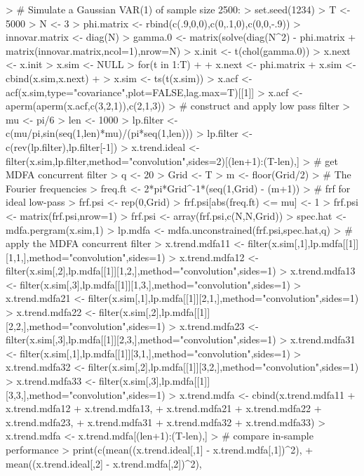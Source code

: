 \documentclass[a4paper]{book}
\begin{document}
\begin{Schunk}
\begin{Sinput}
> # Simulate a Gaussian VAR(1) of sample size 2500:
> set.seed(1234)
> T <- 5000
> N <- 3
> phi.matrix <- rbind(c(.9,0,0),c(0,.1,0),c(0,0,-.9))
> innovar.matrix <- diag(N)
> gamma.0 <- matrix(solve(diag(N^2) - phi.matrix %
+ 	matrix(innovar.matrix,ncol=1),nrow=N)
> x.init <- t(chol(gamma.0)) %
> x.next <- x.init
> x.sim <- NULL
> for(t in 1:T)
+ {
+ 	x.next <- phi.matrix %
+ 	x.sim <- cbind(x.sim,x.next)
+ }
> x.sim <- ts(t(x.sim))
> x.acf <- acf(x.sim,type="covariance",plot=FALSE,lag.max=T)[[1]]
> x.acf <- aperm(aperm(x.acf,c(3,2,1)),c(2,1,3))
> # construct and apply low pass filter
> mu <- pi/6
> len <- 1000
> lp.filter <- c(mu/pi,sin(seq(1,len)*mu)/(pi*seq(1,len)))
> lp.filter <- c(rev(lp.filter),lp.filter[-1])
> x.trend.ideal <- filter(x.sim,lp.filter,method="convolution",sides=2)[(len+1):(T-len),]
> # get MDFA concurrent filter
> q <- 20
> Grid <- T
> m <- floor(Grid/2)
> # The Fourier frequencies
> freq.ft <- 2*pi*Grid^{-1}*(seq(1,Grid) - (m+1))
> # frf for ideal low-pass
> frf.psi <- rep(0,Grid)
> frf.psi[abs(freq.ft) <= mu] <- 1
> frf.psi <- matrix(frf.psi,nrow=1) %
> frf.psi <- array(frf.psi,c(N,N,Grid))
> spec.hat <- mdfa.pergram(x.sim,1)	
> lp.mdfa <- mdfa.unconstrained(frf.psi,spec.hat,q)
> # apply the MDFA concurrent filter
> x.trend.mdfa11 <- filter(x.sim[,1],lp.mdfa[[1]][1,1,],method="convolution",sides=1)
> x.trend.mdfa12 <- filter(x.sim[,2],lp.mdfa[[1]][1,2,],method="convolution",sides=1)
> x.trend.mdfa13 <- filter(x.sim[,3],lp.mdfa[[1]][1,3,],method="convolution",sides=1)
> x.trend.mdfa21 <- filter(x.sim[,1],lp.mdfa[[1]][2,1,],method="convolution",sides=1)
> x.trend.mdfa22 <- filter(x.sim[,2],lp.mdfa[[1]][2,2,],method="convolution",sides=1)
> x.trend.mdfa23 <- filter(x.sim[,3],lp.mdfa[[1]][2,3,],method="convolution",sides=1)
> x.trend.mdfa31 <- filter(x.sim[,1],lp.mdfa[[1]][3,1,],method="convolution",sides=1)
> x.trend.mdfa32 <- filter(x.sim[,2],lp.mdfa[[1]][3,2,],method="convolution",sides=1)
> x.trend.mdfa33 <- filter(x.sim[,3],lp.mdfa[[1]][3,3,],method="convolution",sides=1)
> x.trend.mdfa <- cbind(x.trend.mdfa11 + x.trend.mdfa12 + x.trend.mdfa13,
+ 	x.trend.mdfa21 + x.trend.mdfa22 + x.trend.mdfa23,
+ 	x.trend.mdfa31 + x.trend.mdfa32 + x.trend.mdfa33)
> x.trend.mdfa <- x.trend.mdfa[(len+1):(T-len),] 
> # compare in-sample performance
> print(c(mean((x.trend.ideal[,1] - x.trend.mdfa[,1])^2),
+ 	mean((x.trend.ideal[,2] - x.trend.mdfa[,2])^2),

\end{Sinput}
\end{Schunk}
\end{document}

